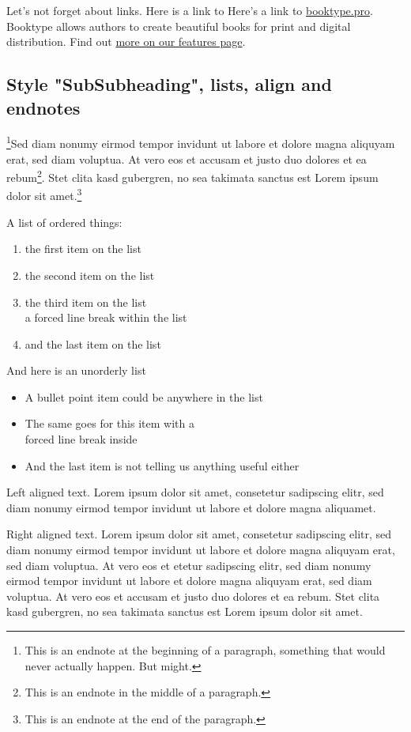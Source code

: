 Let's not forget about links. Here is a link to
Here's a link to \href{https://booktype.pro/}{booktype.pro}. 
Booktype allows authors to create beautiful books for print and digital
distribution. Find out 
\href{https://booktype.pro/en/booktype/screenshots/}{more on our
features page}.

\subsection{Style "SubSubheading", lists, align and endnotes}
\footnote{This is an endnote at the beginning
of a paragraph, something that would never actually happen. But
might.}Sed diam
nonumy eirmod tempor invidunt ut labore et dolore magna aliquyam
erat, sed diam voluptua. At vero eos et accusam et justo duo
dolores et ea rebum\footnote{This is an endnote in the middle of
a paragraph.}. Stet clita kasd gubergren, no sea takimata
sanctus est Lorem ipsum dolor sit amet.\footnote{This is an endnote at the end of the
paragraph.}

A list of ordered things:

\begin{enumerate}  
\item the first item on the list 
\item the second item on the list 
\item the third item on the list\\a forced line break within the list
\item and the last item on the list
\end{enumerate}

And here is an unorderly list

\begin{itemize}
\item A bullet point item could be anywhere in the list
\item The same goes for this item with a\\forced line break inside
\item And the last item is not telling us anything useful either
\end{itemize}

\begin{flushleft}
Left aligned text. Lorem ipsum dolor sit amet, consetetur
sadipscing elitr, sed diam nonumy eirmod tempor invidunt ut labore
et dolore magna aliquamet.
\end{flushleft}

\begin{flushright}
Right aligned
text. Lorem ipsum dolor sit amet, consetetur sadipscing elitr,
sed diam nonumy eirmod tempor invidunt ut labore et dolore magna
aliquyam erat, sed diam voluptua. At vero eos et etetur sadipscing
elitr, sed diam nonumy eirmod tempor invidunt ut labore et dolore
magna aliquyam erat, sed diam voluptua. At vero eos et accusam et
justo duo dolores et ea rebum. Stet clita kasd gubergren, no sea
takimata sanctus est Lorem ipsum dolor sit amet.
\end{flushright}


